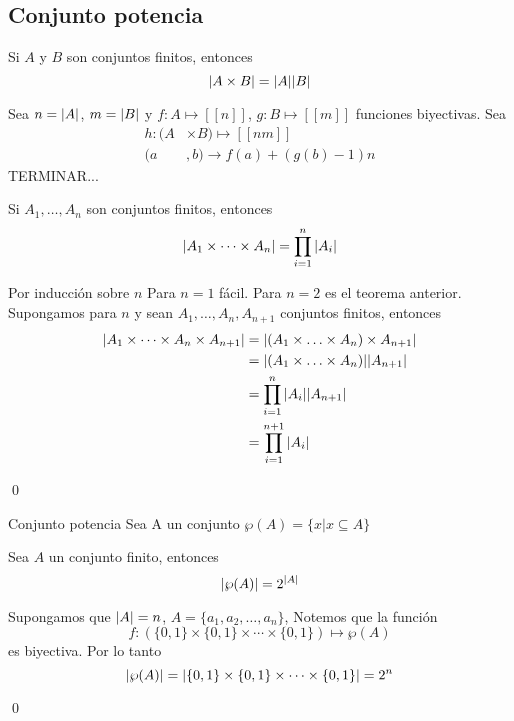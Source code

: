 	\subsection{Conjunto potencia}
		\begin{theorem}{}
			Si $A$ y $B$ son conjuntos finitos, entonces
			$$\abs{A\times B}=\abs{A}\abs{B}$$
		\end{theorem}
		\begin{demostration}{}
			Sea $n=\abs{A}$, $m=\abs{B}$ y $f:A\longmapsto [[n]]$, $g:B\longmapsto [[m]]$ funciones biyectivas. Sea
			\begin{align*}
				h:(A&\times B)\longmapsto[[nm]] \\
				(a&,b)\longrightarrow f(a)+(g(b)-1)n
			\end{align*}
			TERMINAR...
		\end{demostration}
		\begin{corollary}{}
			Si $A_1,\dotso,A_n$ son conjuntos finitos, entonces 
			$$\abs{A_1\times\dotsb\times A_n}=\prod_{i=1}^{n}{\abs{A_i}}$$
		\end{corollary}
		\begin{demostration}{}
			Por inducción sobre $n$
			Para $n=1$ fácil.
			Para $n=2$ es el teorema anterior.
			Supongamos para $n$ y sean $A_1,\dotso,A_n,A_{n+1}$ conjuntos finitos, entonces
			\begin{align*}
				\abs{A_1\times\dotsb\times A_n\times A_{n+1}}&=\abs{(A_1\times\dotso\times A_n)\times A_{n+1}} \\
				&=\abs{(A_1\times\dotso\times A_n)}\abs{A_{n+1}}\\
				&=\prod_{i=1}^{n}{\abs{A_i}}\abs{A_{n+1}}\\
				&=\prod_{i=1}^{n+1}{\abs{A_i}}
			\end{align*}
			\begin{flushright}
				\qed
			\end{flushright}
		\end{demostration}
		\begin{definition}{Conjunto potencia}
			Sea A un conjunto $\wp(A)=\{x|x\subseteq A\}$ 
		\end{definition}
		\begin{theorem}{}
			Sea $A$ un conjunto finito, entonces
			$$\abs{\wp(A)}=2^{\abs{A}}$$
		\end{theorem}
		\begin{demostration}{}
		
		Supongamos que $\abs{A}=n$, $A=\{a_1,a_2,\dotso,a_n\}$, Notemos que la función $$f:(\{0,1\}\times\{0,1\}\times\dotsb\times\{0,1\})\longmapsto\wp(A)$$ es biyectiva. Por lo tanto $$\abs{\wp(A)}=\abs{\{0,1\}\times\{0,1\}\times\dotsb\times\{0,1\}}=2^n$$
		\begin{flushright}
			\qed
		\end{flushright}
	\end{demostration}
